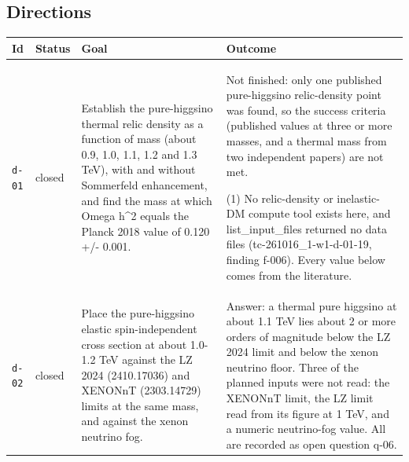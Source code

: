 \documentclass[11pt,a4paper]{article}
\begin{document}
\subsection{Directions}
\begin{longtable}{@{}p{}p{}p{}p{}@{}}
\toprule Id & Status & Goal & Outcome \\ \midrule \endhead
\texttt{d-01} & closed & Establish the pure-higgsino thermal relic density as a function of mass (about 0.9, 1.0, 1.1, 1.2 and 1.3 TeV), with and without Sommerfeld enhancement, and find the mass at which Omega h\textasciicircum{}2 equals the Planck 2018 value of 0.120 +/- 0.001. & Not finished: only one published pure-higgsino relic-density point was found, so the success criteria (published values at three or more masses, and a thermal mass from two independent papers) are not met.

(1) No relic-density or inelastic-DM compute tool exists here, and list\_input\_files returned no data files (tc-261016\_1-w1-d-01-19, finding f-006). Every value below comes from the literature.  \\
\texttt{d-02} & closed & Place the pure-higgsino elastic spin-independent cross section at about 1.0-1.2 TeV against the LZ 2024 (2410.17036) and XENONnT (2303.14729) limits at the same mass, and against the xenon neutrino fog. & Answer: a thermal pure higgsino at about 1.1 TeV lies about 2 or more orders of magnitude below the LZ 2024 limit and below the xenon neutrino floor. Three of the planned inputs were not read: the XENONnT limit, the LZ limit read from its figure at 1 TeV, and a numeric neutrino-fog value. All are recorded as open question q-06.


\end{longtable}
\end{document}
